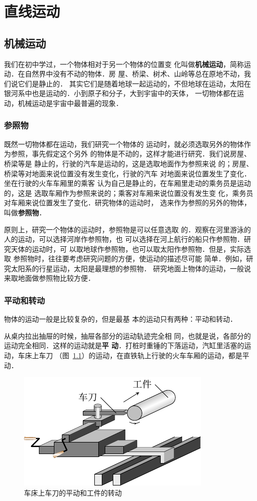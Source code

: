 \chapter{直线运动}\label{chapter-rectilinear-motion}

\section{机械运动}
 我们在初中学过，一个物体相对于另一个物体的位置变
化叫做\textbf{机械运动}，简称运动．在自然界中没有不动的物体．房
屋、桥梁、树术、山岭等总在原地不动，我们说它们是静止的．
其实它们是随着地球一起运动的，不但地球在运动，太阳在
银河系中也是运动的．小到原子和分子，大到宇宙中的天体，
一切物体都在运动，机械运动是宇宙中最普遍的现象．

\subsection{参照物} 

既然一切物体都在运动，我们研究一个物体的
运动时，就必须选取另外的物体作为参照，事先假定这个另外
的物体是不动的，这样才能进行研究．我们说房屋、桥梁等是
静止的，行驶的汽车是运动的，这是选取地面作为参照来说
的；房屋、桥梁等对地面来说位置没有发生变化，行驶的汽车
对地面来说位置发生了变化．坐在行驶的火车车厢里的乘客
认为自己是静止的，在车厢里走动的乘务员是运动的，这是
选取车厢作为参照来说的；乘客对车厢来说位置没有发生变
化，乘务员对车厢来说位置发生了变化．研究物体的运动时，
选来作为参照的另外的物体，叫做\textbf{参照物}．

    原则上，研究一个物体的运动时，参照物是可以任意选取
的．观察在河里游泳的人的运动，可以选择河岸作参照物，也
可以选择在河上航行的船只作参照物．研究天体的运动时，可
以取地球作参照物，也可以取太阳作参照物．但是，实际选取
参照物时，往往要考虑研究问题的方便，使运动的描述尽可能
简单．例如，研究太阳系的行星运动，太阳是最理想的参照物．
研究地面上物体的运动，一般说来取地面做参照物比较方便．

\subsection{平动和转动} 
 物体的运动一般是比较复杂的，但是最基
本的运动只有两种：平动和转动．

    从桌内拉出抽屉的时候，抽屉各部分的运动轨迹完全相
同，也就是说，各部分的运动完全相同．这样的运动就是\textbf{平
动}．打桩时重锤的下落运动，汽缸里活塞的运动，车床上车刀
（图~\ref{fig_A_2-1}）的运动，在直铁轨上行驶的火车车厢的运动，都是平
动．
\begin{figure}[htbp]
\centering
\includegraphics{fig/A/2-1.pdf}
\caption{车床上车刀的平动和工件的转动}\label{fig_A_2-1}
\end{figure}

